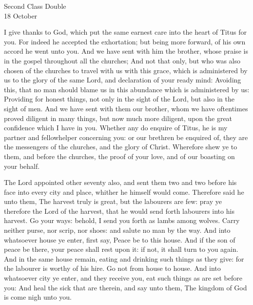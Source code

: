 \begin{inhead}
    {Second Class Double\\
18 October}
\end{inhead}


 I give thanks to God, which put the same earnest care into the heart of Titus for you. For indeed he accepted the exhortation; but being more forward, of his own accord he went unto you. And we have sent with him the brother, whose praise is in the gospel throughout all the churches; And not that only, but who was also chosen of the churches to travel with us with this grace, which is administered by us to the glory of the same Lord, and declaration of your ready mind: Avoiding this, that no man should blame us in this abundance which is administered by us: Providing for honest things, not only in the sight of the Lord, but also in the sight of men. And we have sent with them our brother, whom we have oftentimes proved diligent in many things, but now much more diligent, upon the great confidence which I have in you. Whether any do enquire of Titus, he is my partner and fellowhelper concerning you: or our brethren be enquired of, they are the messengers of the churches, and the glory of Christ. Wherefore shew ye to them, and before the churches, the proof of your love, and of our boasting on your behalf.

 The Lord appointed other seventy also, and sent them two and two before his face into every city and place, whither he himself would come. Therefore said he unto them, The harvest truly is great, but the labourers are few: pray ye therefore the Lord of the harvest, that he would send forth labourers into his harvest. Go your ways: behold, I send you forth as lambs among wolves. Carry neither purse, nor scrip, nor shoes: and salute no man by the way. And into whatsoever house ye enter, first say, Peace be to this house. And if the son of peace be there, your peace shall rest upon it: if not, it shall turn to you again. And in the same house remain, eating and drinking such things as they give: for the labourer is worthy of his hire. Go not from house to house. And into whatsoever city ye enter, and they receive you, eat such things as are set before you: And heal the sick that are therein, and say unto them, The kingdom of God is come nigh unto you.


